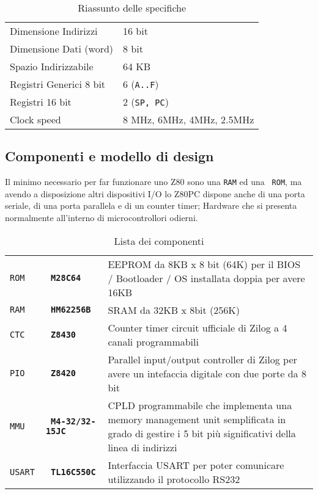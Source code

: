 \documentclass[a4paper, 11pt]{article}
\newcommand{\prj}{Z80\textmu PC\xspace}
\begin{document}
\begin{table}[ht]\centering
\caption{Riassunto delle specifiche}

\begin{tabular}{ l l }
    \\ \hline
    Dimensione Indirizzi    & 16 bit \\
    Dimensione Dati (word)  & 8 bit \\
    Spazio Indirizzabile    & 64 KB \\
    Registri Generici 8 bit & 6 ({\tt A..F}) \\
    Registri 16 bit         & 2 ({\tt SP, PC}) \\
    Clock speed             & 8 MHz, 6MHz, 4MHz, 2.5MHz \\
    \hline
\end{tabular}
\end{table}

\subsection{Componenti e modello di design}

Il minimo necessario per far funzionare uno Z80 sono una {\tt RAM} ed una {\tt
ROM}, ma avendo a disposizione altri dispositivi I/O lo \prj dispone anche di
una porta seriale, di una porta parallela e di un counter timer; Hardware che
si presenta normalmente all'interno di microcontrollori odierni.  

\begin{table}[hb]\centering
\caption{Lista dei componenti}
\begin{tabular}{ >{\tt}l >{\tt\bfseries}l >{\footnotesize}p{.7\linewidth} }
    \\ \hline
    ROM & M28C64    & EEPROM da 8KB x 8 bit (64K) per il BIOS / Bootloader /
                      OS installata doppia per avere 16KB \\
    RAM & HM62256B  & SRAM da 32KB x 8bit (256K) \\
    CTC & Z8430     & Counter timer circuit ufficiale di Zilog a 4 canali
                      programmabili \\
    PIO & Z8420     & Parallel input/output controller di Zilog per avere un
                      intefaccia digitale con due porte da 8 bit \\
    MMU & M4-32/32-15JC & CPLD programmabile che implementa una memory 
                          management unit semplificata in grado di gestire i 5
                          bit pi\`u significativi della linea di indirizzi \\
    USART & TL16C550C & Interfaccia USART per poter comunicare utilizzando il
                        protocollo RS232 \\
    \hline
\end{tabular}
\end{table}
\end{document}
